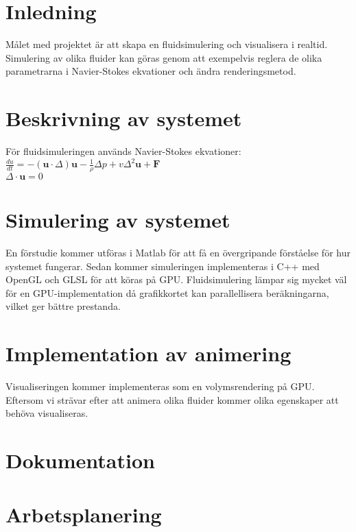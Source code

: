 \documentclass[a4paper,12pt,twoside,swedish]{report}
\begin{document}
\pagestyle{plain}

\setcounter{page}{1}

\section{Inledning}
Målet med projektet är att skapa en fluidsimulering och visualisera i realtid. Simulering av olika fluider kan göras genom att exempelvis reglera de olika parametrarna i Navier-Stokes ekvationer och ändra renderingsmetod. 

\section{Beskrivning av systemet}
För fluidsimuleringen används Navier-Stokes ekvationer:\\
\(\frac{du}{dt} = - (\textbf{u}\cdot{\Delta})\textbf{u} - \frac{1}{\rho}\Delta p + v \Delta^2 \textbf{u} + \textbf{F}\) \\
\(\Delta \cdot \textbf{u} = 0 \) \\

\section{Simulering av systemet}
En förstudie kommer utföras i Matlab för att få en övergripande förståelse för hur systemet fungerar. Sedan kommer simuleringen implementeras i C++ med OpenGL och GLSL för att köras på GPU. Fluidsimulering lämpar sig mycket väl för en GPU-implementation då grafikkortet kan parallellisera beräkningarna, vilket ger bättre  prestanda.
 
\section{Implementation av animering}
Visualiseringen kommer implementeras som en volymsrendering på GPU. Eftersom vi strävar efter att animera olika fluider kommer olika egenskaper att behöva visualiseras.

\section{Dokumentation}

\section{Arbetsplanering}
	
\end{document}
